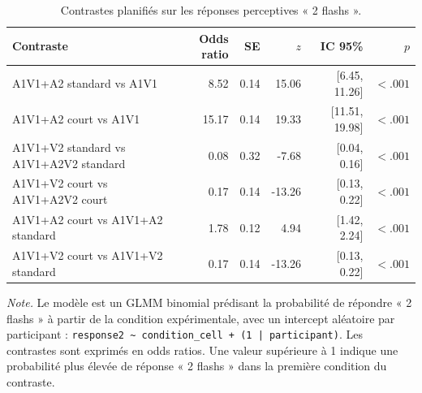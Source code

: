 \begin{table}[ht]
\centering
\caption{Contrastes planifiés sur les réponses perceptives « 2 flashs ».}
\label{tab:perceptual_response_contrasts_v2}
\scriptsize
\begin{tabular}{p{5.2cm}rrrrr}
\toprule
Contraste & Odds ratio & SE & $z$ & IC 95\% & $p$ \\
\midrule
A1V1+A2 standard vs A1V1 & 8.52 & 0.14 & 15.06 & [6.45, 11.26] & $< .001$ \\
A1V1+A2 court vs A1V1 & 15.17 & 0.14 & 19.33 & [11.51, 19.98] & $< .001$ \\
A1V1+V2 standard vs A1V1+A2V2 standard & 0.08 & 0.32 & -7.68 & [0.04, 0.16] & $< .001$ \\
A1V1+V2 court vs A1V1+A2V2 court & 0.17 & 0.14 & -13.26 & [0.13, 0.22] & $< .001$ \\
A1V1+A2 court vs A1V1+A2 standard & 1.78 & 0.12 & 4.94 & [1.42, 2.24] & $< .001$ \\
A1V1+V2 court vs A1V1+V2 standard & 0.17 & 0.14 & -13.26 & [0.13, 0.22] & $< .001$ \\
\bottomrule
\end{tabular}

\vspace{0.2cm}
\begin{minipage}{0.94\textwidth}
\footnotesize
\textit{Note.} Le modèle est un GLMM binomial prédisant la probabilité de répondre « 2 flashs » à partir de la condition expérimentale, avec un intercept aléatoire par participant : \texttt{response2 \textasciitilde{} condition\_cell + (1 | participant)}. Les contrastes sont exprimés en odds ratios. Une valeur supérieure à 1 indique une probabilité plus élevée de réponse « 2 flashs » dans la première condition du contraste.
\end{minipage}
\end{table}

